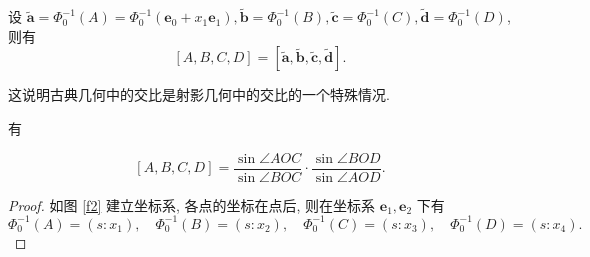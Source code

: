 \documentclass[color=black,device=normal,lang=cn,mode=geye]{elegantnote}
\begin{document}
设 $\tilde{\boldsymbol{a}}=\Phi^{-1}_0(A)=\Phi^{-1}_0(\boldsymbol{e}_0+x_1\boldsymbol{e}_1),\tilde{\boldsymbol{b}}=\Phi^{-1}_0(B),\tilde{\boldsymbol{c}}=\Phi^{-1}_0(C),\tilde{\boldsymbol{d}}=\Phi^{-1}_0(D)$, 则有
\[[A,B,C,D]=[\tilde{\boldsymbol{a}},\tilde{\boldsymbol{b}},\tilde{\boldsymbol{c}},\tilde{\boldsymbol{d}}].\]

这说明古典几何中的交比是射影几何中的交比的一个特殊情况.

有
\begin{theorem}
    \[[A,B,C,D]=\dfrac{\sin\angle AOC}{\sin\angle BOC}\cdot\dfrac{\sin\angle BOD}{\sin\angle AOD}.\]
\end{theorem}
\begin{proof}
    如图 \ref{f2} 建立坐标系, 各点的坐标在点后, 则在坐标系 $\boldsymbol{e}_1,\boldsymbol{e}_2$ 下有
    \[\Phi_0^{-1}(A)=(s:x_1),\quad\Phi_0^{-1}(B)=(s:x_2),\quad\Phi_0^{-1}(C)=(s:x_3),\quad\Phi_0^{-1}(D)=(s:x_4).\]


\end{proof}
\end{document}
